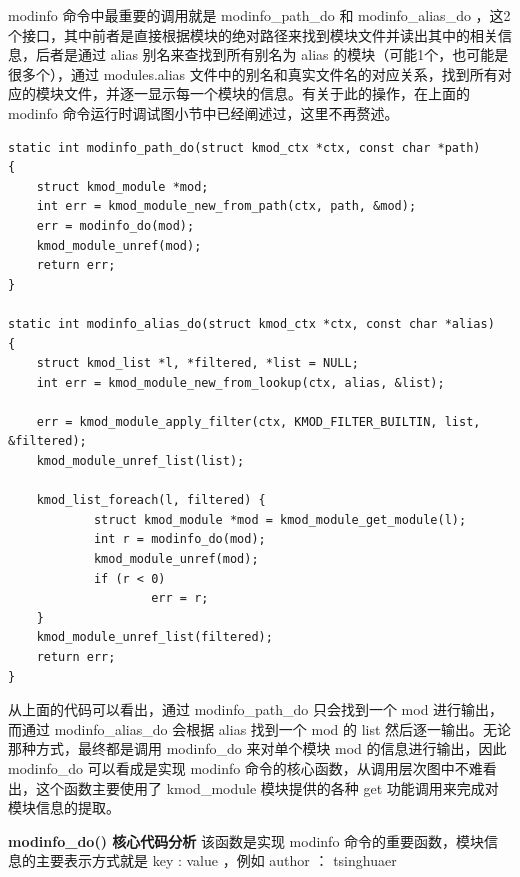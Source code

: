 \documentclass[11pt,a4paper]{article}
\begin{document}
modinfo 命令中最重要的调用就是 modinfo\_path\_do 和 modinfo\_alias\_do
，这2个接口，其中前者是直接根据模块的绝对路径来找到模块文件并读出其中的相关信息，后者是通过
alias 别名来查找到所有别名为 alias 的模块（可能1个，也可能是很多个），通过
modules.alias
文件中的别名和真实文件名的对应关系，找到所有对应的模块文件，并逐一显示每一个模块的信息。有关于此的操作，在上面的
modinfo 命令运行时调试图小节中已经阐述过，这里不再赘述。

{\begin{shaded}\begin{verbatim}
static int modinfo_path_do(struct kmod_ctx *ctx, const char *path)
{
    struct kmod_module *mod;
    int err = kmod_module_new_from_path(ctx, path, &mod);
    err = modinfo_do(mod);
    kmod_module_unref(mod);
    return err;
}

static int modinfo_alias_do(struct kmod_ctx *ctx, const char *alias)
{
    struct kmod_list *l, *filtered, *list = NULL;
    int err = kmod_module_new_from_lookup(ctx, alias, &list);

    err = kmod_module_apply_filter(ctx, KMOD_FILTER_BUILTIN, list, &filtered);
    kmod_module_unref_list(list);

    kmod_list_foreach(l, filtered) {
            struct kmod_module *mod = kmod_module_get_module(l);
            int r = modinfo_do(mod);
            kmod_module_unref(mod);
            if (r < 0)
                    err = r;
    }
    kmod_module_unref_list(filtered);
    return err;
}
\end{verbatim}\end{shaded}}
从上面的代码可以看出，通过 modinfo\_path\_do 只会找到一个 mod
进行输出，而通过 modinfo\_alias\_do 会根据 alias 找到一个 mod 的 list
然后逐一输出。无论那种方式，最终都是调用 modinfo\_do 来对单个模块 mod
的信息进行输出，因此 modinfo\_do 可以看成是实现 modinfo
命令的核心函数，从调用层次图中不难看出，这个函数主要使用了 kmod\_module
模块提供的各种 get 功能调用来完成对模块信息的提取。

\textbf{modinfo\_do() 核心代码分析} 该函数是实现 modinfo
命令的重要函数，模块信息的主要表示方式就是 key : value ，例如 author ：
tsinghuaer
\end{document}
